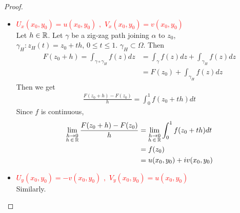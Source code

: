 \begin{thm}
\begin{enumerate}
\begin{proof}
\begin{enumerate}
					\vspace{1.5em}
					\begin{itemize}
						\item \textcolor{red}{$U_{x}(x_0 , y_0) = u(x_0 , y_0) \,\, , \,\, V_{x}(x_0 , y_0) = v(x_0 , y_0)$}\\
						Let $h \in \mathbb{R}$. Let $\gamma$ be a zig-zag path joining $\alpha$ to $z_0$, \\
						$\gamma_{H} : z_{H}(t) = z_0 + th$, $0 \leq t \leq 1$. $\gamma_H \subset \Omega$. Then
						\begin{align}
							F(z_0 + h) = \int_{\gamma \circ \gamma_H}{f(z) dz} 
							&= \int_{\gamma}{f(z) dz} + \int_{\gamma_H}{f(z) dz} \\
							&= F(z_0) + \int_{\gamma_H}{f(z) dz}
						\end{align}
						Then we get
						\begin{align}
							\frac{F(z_0 + h) - F(z_0)}{h} = \int_{0}^{1}{f(z_0 + th) dt}
						\end{align}
						Since $f$ is continuous,
						\begin{align}
							\lim_{\substack{h \to 0 \\ h \, \in \, \mathbb{R}}}{\frac{F(z_0 + h) - F(z_0)}{h}} 
							&= \lim_{\substack{h \to 0 \\ h \, \in \, \mathbb{R}}}{\int_{0}^{1}{f(z_0 + th) dt}} \\
							&= f(z_0) \\
							&= u(x_0 , y_0) + i v(x_0 , y_0)
						\end{align}
					
						\item \textcolor{red}{$U_{y}(x_0 , y_0) = -v(x_0 , y_0) \,\, , \,\, V_{y}(x_0 , y_0) = u(x_0 , y_0)$}\\
						Similarly.
					\end{itemize}
				\end{enumerate}
			\end{proof}
		\end{enumerate}
	\end{thm}

\newpage
